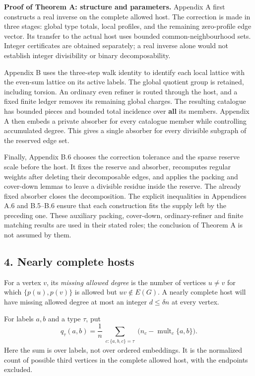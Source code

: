 \documentclass[english,11pt,a4paper]{article}
\begin{document}
\textbf{Proof of Theorem A: structure and parameters.} Appendix A first constructs a real inverse on the complete allowed host. The correction is made in three stages: global type totals, local profiles, and the remaining zero-profile edge vector. Its transfer to the actual host uses bounded common-neighbourhood sets. Integer certificates are obtained separately; a real inverse alone would not establish integer divisibility or binary decomposability.

Appendix B uses the three-step walk identity to identify each local lattice with the even-sum lattice on its active labels. The global quotient group is retained, including torsion. An ordinary even refiner is routed through the host, and a fixed finite ledger removes its remaining global charges. The resulting catalogue has bounded pieces and bounded total incidence over \textbf{all} its members. Appendix A then embeds a private absorber for every catalogue member while controlling accumulated degree. This gives a single absorber for every divisible subgraph of the reserved edge set.

Finally, Appendix B.6 chooses the correction tolerance and the sparse reserve scale before the host. It fixes the reserve and absorber, recomputes regular weights after deleting their decomposable edges, and applies the packing and cover-down lemmas to leave a divisible residue inside the reserve. The already fixed absorber closes the decomposition. The explicit inequalities in Appendices A.6 and B.5--B.6 ensure that each construction fits the supply left by the preceding one. These auxiliary packing, cover-down, ordinary-refiner and finite matching results are used in their stated roles; the conclusion of Theorem A is not assumed by them.


\subsection{4. Nearly complete hosts}\label{nearly-complete-hosts}

For a vertex \(v\), its \emph{missing allowed degree} is the number of vertices \(u\ne v\) for which \(\{p(u),p(v)\}\) is allowed but \(uv\notin E(G)\). A nearly complete host will have missing allowed degree at most an integer \(d\le\delta n\) at every vertex.

For labels \(a,b\) and a type \(\tau\), put \[q_\tau(a,b)=\frac1n
\sum_{\substack{c:\{a,b,c\}=\tau}}
\bigl(n_c-\operatorname{mult}_c\{a,b\}\bigr).
\tag{4.1}\] Here the sum is over labels, not over ordered embeddings. It is the normalized count of possible third vertices in the complete allowed host, with the endpoints excluded.
\end{document}
